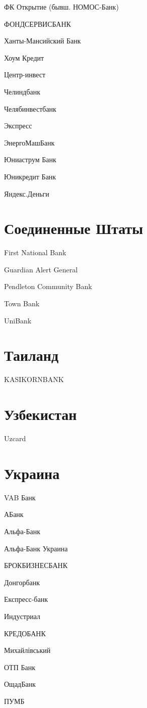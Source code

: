 \documentclass[a4paper,10pt,russian]{sphinxmanual}
\begin{document}
ФК Открытие (бывш. НОМОС-Банк)

ФОНДСЕРВИСБАНК

Ханты-Мансийский Банк

Хоум Кредит

Центр-инвест

Челиндбанк

Челябинвестбанк

Экспресс

ЭнергоМашБанк

Юниаструм Банк

Юникредит Банк

Яндекс.Деньги


\section{Соединенные Штаты}
\label{\detokenize{banks:id12}}
First National Bank

Guardian Alert General

Pendleton Community Bank

Town Bank

UniBank


\section{Таиланд}
\label{\detokenize{banks:id13}}
KASIKORNBANK


\section{Узбекистан}
\label{\detokenize{banks:id14}}
Uzcard


\section{Украина}
\label{\detokenize{banks:id15}}
VAB Банк

АБанк

Альфа-Банк

Альфа-Банк Украина

БРОКБИЗНЕСБАНК

Донгорбанк

Експресс-банк

Индустриал

КРЕДОБАНК

Михайлівський

ОТП Банк

ОщадБанк

ПУМБ
\end{document}
